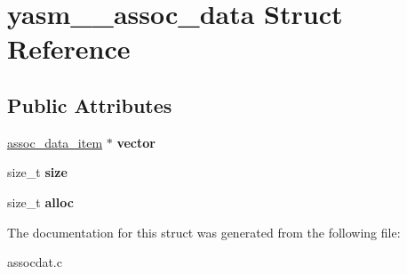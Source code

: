 \hypertarget{structyasm____assoc__data}{\section{yasm\-\_\-\-\_\-assoc\-\_\-data Struct Reference}
\label{structyasm____assoc__data}
}
\subsection*{Public Attributes}
\begin{DoxyCompactItemize}
\item 
\hypertarget{structyasm____assoc__data_ab96752378f7fad576276a68a8deb7a0a}{\hyperlink{structassoc__data__item}{assoc\-\_\-data\-\_\-item} $\ast$ {\bfseries vector}}\label{structyasm____assoc__data_ab96752378f7fad576276a68a8deb7a0a}

\item 
\hypertarget{structyasm____assoc__data_ad1f98ed69be1901744a7ea3b813c057c}{size\-\_\-t {\bfseries size}}\label{structyasm____assoc__data_ad1f98ed69be1901744a7ea3b813c057c}

\item 
\hypertarget{structyasm____assoc__data_a695c4bb413d00b30f1383125fd1072a7}{size\-\_\-t {\bfseries alloc}}\label{structyasm____assoc__data_a695c4bb413d00b30f1383125fd1072a7}

\end{DoxyCompactItemize}


The documentation for this struct was generated from the following file\-:\begin{DoxyCompactItemize}
\item 
assocdat.\-c\end{DoxyCompactItemize}
